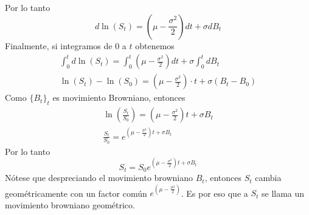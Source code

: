 \documentclass[11pt,notitlepage]{article}
\begin{document}
Por lo tanto
\begin{equation}
    \label{eq:lnSt}
    d\ln{(S_t)} = \left(\mu - \frac{\sigma^2}{2}\right) dt + \sigma dB_t
\end{equation}
Finalmente, si integramos de 0 a $t$ obtenemos
\begin{align*}
    \int_0^t d\ln{(S_t)} = \int_0^t \left(\mu - \frac{\sigma^2}{2}\right) dt + \sigma \int_0^t dB_t\\
    \ln{(S_t)} - \ln{(S_0)} = \left(\mu - \frac{\sigma^2}{2}\right) \cdot t + \sigma (B_t - B_0)
\end{align*}
Como $\{B_t\}_t$ es movimiento Browniano, entonces
\begin{align*}
    \ln{\left(\frac{S_t}{S_0}\right)} = \left(\mu - \frac{\sigma^2}{2}\right) t + \sigma B_t\\
    \frac{S_t}{S_0} = e^{\left(\mu - \frac{\sigma^2}{2}\right) t + \sigma B_t}
\end{align*}
Por lo tanto
\begin{equation}
    \label{eq:St}
    S_t = S_0 e^{\left(\mu - \frac{\sigma^2}{2}\right) t + \sigma B_t}
\end{equation}
Nótese que despreciando el movimiento browniano $B_t$, entonces $S_t$ cambia geométricamente con un factor común $e^{(\mu - \frac{\sigma^2}{2})}$. Es por eso que a $S_t$ se llama un movimiento browniano geométrico.
\end{document}

